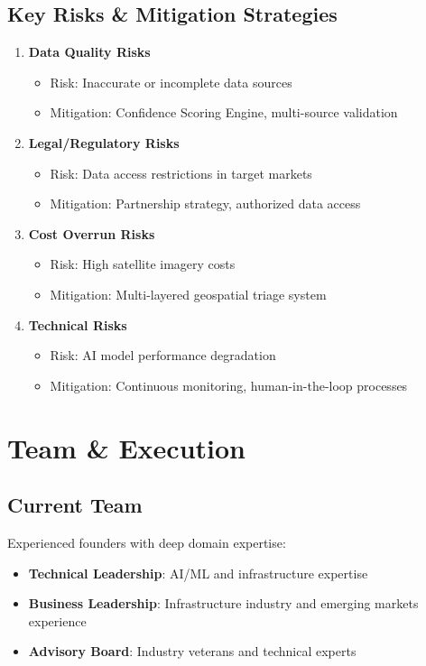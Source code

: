 \documentclass[business]{../templates/infraradar-main}
\begin{document}
\subsection{Key Risks \& Mitigation Strategies}
\begin{enumerate}
    \item \textbf{Data Quality Risks}
    \begin{itemize}
        \item Risk: Inaccurate or incomplete data sources
        \item Mitigation: Confidence Scoring Engine, multi-source validation
    \end{itemize}
    \item \textbf{Legal/Regulatory Risks}
    \begin{itemize}
        \item Risk: Data access restrictions in target markets
        \item Mitigation: Partnership strategy, authorized data access
    \end{itemize}
    \item \textbf{Cost Overrun Risks}
    \begin{itemize}
        \item Risk: High satellite imagery costs
        \item Mitigation: Multi-layered geospatial triage system
    \end{itemize}
    \item \textbf{Technical Risks}
    \begin{itemize}
        \item Risk: AI model performance degradation
        \item Mitigation: Continuous monitoring, human-in-the-loop processes
    \end{itemize}
\end{enumerate}

\section{Team \& Execution}

\subsection{Current Team}
Experienced founders with deep domain expertise:
\begin{itemize}
    \item \textbf{Technical Leadership}: AI/ML and infrastructure expertise
    \item \textbf{Business Leadership}: Infrastructure industry and emerging markets experience
    \item \textbf{Advisory Board}: Industry veterans and technical experts
\end{itemize}
\end{document}
